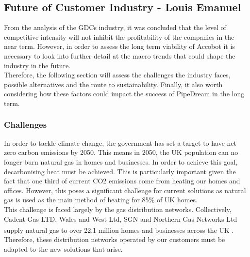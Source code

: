 \documentclass[11pt]{article}		%
\newcommand{\supercite}[1]{\textsuperscript{\cite{#1}}}		%
\begin{document}
        \subsection[Future of Customer Industry]{Future of Customer Industry - Louis Emanuel}
		
    		From the analysis of the GDCs industry, it was concluded that the level of competitive intensity will not inhibit the profitability of the companies in the near term. However, in order to assess the long term viability of Accobot it is necessary to look into further detail at the macro trends that could shape the industry in the future.\\
    	    \hspace*{3ex}Therefore, the following section will assess the challenges the industry faces, possible alternatives and the route to sustainability. Finally, it also worth considering how these factors could impact the success of PipeDream in the long term. 
    	    
    	    \subsubsection[Challenges]{Challenges}
            In order to tackle climate change, the government has set a target to have net zero carbon emissions by 2050. This means in 2050, the UK population can no longer burn natural gas in homes and businesses. In order to achieve this goal, decarbonising heat must be achieved. This is particularly important given the fact that one third of current CO2 emissions come from heating our homes and offices. However, this poses a significant challenge for current solutions as natural gas is used as the main method of heating for 85\% of UK homes.\\
            \hspace*{3ex}This challenge is faced largely by the gas distribution networks. Collectively, Cadent Gas LTD, Wales and West Ltd, SGN and Northern Gas Networks Ltd supply natural gas to over 22.1 million homes and businesses across the UK \supercite{supplied}. Therefore, these distribution networks operated by our customers must be adapted to the new solutions that arise. 
    
\end{document}
